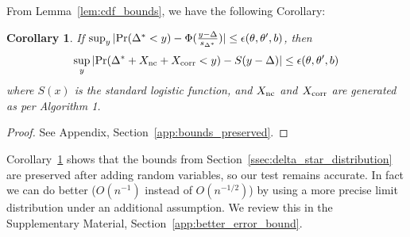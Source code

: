 \documentclass{article}
\newtheorem{corollary}{Corollary}
\begin{document}
From Lemma~\ref{lem:cdf_bounds}, we have the following Corollary:

\begin{corollary}\label{cor:bounds_preserved}
If $\sup_y|{\rm Pr}(\Delta^* < y) - \Phi(\frac{y-\Delta}{s_{\Delta^*}})|
\leq \epsilon(\theta,\theta',b)$, then
\[
    \sup_y|{\rm Pr}(\Delta^*+X_{\rm nc}+X_{\rm corr} < y) - S(y-\Delta)| \leq \epsilon(\theta,\theta',b)
\]
where $S(x)$ is the standard logistic function, and $X_{\rm nc}$ and $X_{\rm corr}$ are generated as per Algorithm 1. 
\end{corollary}

\begin{proof}
See Appendix, Section~\ref{app:bounds_preserved}.
\end{proof}

Corollary~\ref{cor:bounds_preserved} shows that the bounds from
Section~\ref{ssec:delta_star_distribution} are preserved after adding 
random variables, so our test remains accurate.  In fact we can do better
($O(n^{-1})$ instead of $O(n^{-1/2})$) by using a more precise limit
distribution under an additional assumption. We review this in the Supplementary
Material, Section~\ref{app:better_error_bound}.


\end{document}
